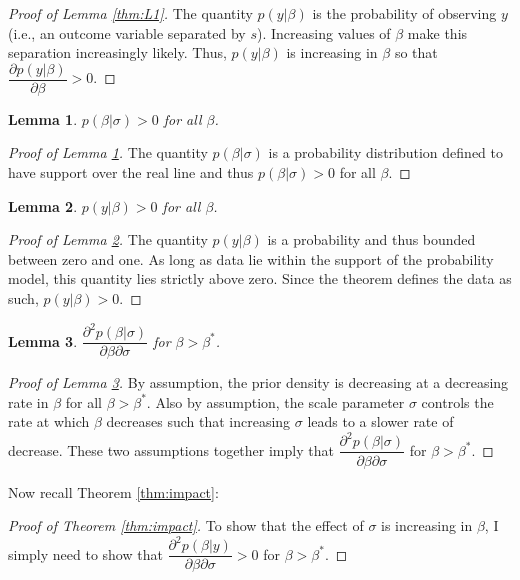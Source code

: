 \documentclass[12pt]{article}
\newtheorem{lemma}{Lemma}
\begin{document}
\begin{appendix}
\begin{proof}[Proof of Lemma \ref{thm:L1}]
The quantity $p(y | \beta)$ is the probability of observing $y$ (i.e., an outcome variable separated by $s$). Increasing values of $\beta$ make this separation increasingly likely. Thus, $p(y | \beta)$ is increasing in $\beta$ so that $\dfrac{\partial p(y | \beta)}{\partial \beta} > 0$. 
\end{proof}

\begin{lemma}\label{thm:L2}
$p(\beta | \sigma) > 0$ for all $\beta$.
\end{lemma}

\begin{proof}[Proof of Lemma \ref{thm:L2}]
The quantity $p(\beta | \sigma)$ is a probability distribution defined to have support over the real line and thus $p(\beta | \sigma) > 0$ for all $\beta$. 
\end{proof}

\begin{lemma}\label{thm:L3}
$p(y | \beta) > 0$ for all $\beta$.
\end{lemma}

\begin{proof}[Proof of Lemma \ref{thm:L3}]
The quantity $p(y | \beta)$ is a probability and thus bounded between zero and one. As long as data lie within the support of the probability model, this quantity lies strictly above zero. Since the theorem defines the data as such, $p(y | \beta) > 0$.
\end{proof}

\begin{lemma}\label{thm:L4}
$\dfrac{\partial^2 p(\beta | \sigma)}{\partial \beta \partial \sigma}$ for $\beta > \beta^*$.
\end{lemma}

\begin{proof}[Proof of Lemma \ref{thm:L4}]
By assumption, the prior density is decreasing at a decreasing rate in $\beta$ for all $\beta > \beta^*$. Also by assumption, the scale parameter $\sigma$ controls the rate at which $\beta$ decreases such that increasing $\sigma$ leads to a slower rate of decrease. These two assumptions together imply that $\dfrac{\partial^2 p(\beta | \sigma)}{\partial \beta \partial \sigma}$ for $\beta > \beta^*$.
\end{proof}

Now recall Theorem \ref{thm:impact}:

\impact*

\begin{proof}[Proof of Theorem \ref{thm:impact}]
To show that the effect of $\sigma$ is increasing in $\beta$, I simply need to show that $\dfrac{\partial^2 p(\beta | y)}{\partial \beta \partial \sigma} > 0$ for $\beta > \beta^*$. 


\end{proof}
\end{appendix}
\end{document}
